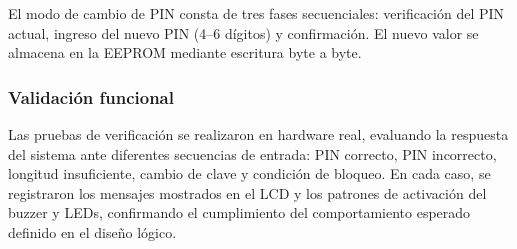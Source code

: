 El modo de cambio de PIN consta de tres fases secuenciales: verificación del PIN actual, ingreso del nuevo PIN (4–6 dígitos) y confirmación.  
El nuevo valor se almacena en la EEPROM mediante escritura byte a byte.

\subsubsection{Validación funcional}

Las pruebas de verificación se realizaron en hardware real, 
evaluando la respuesta del sistema ante diferentes secuencias de entrada: 
PIN correcto, PIN incorrecto, longitud insuficiente, cambio de clave y condición de bloqueo.  
En cada caso, se registraron los mensajes mostrados en el LCD y los patrones de activación del buzzer y LEDs, 
confirmando el cumplimiento del comportamiento esperado definido en el diseño lógico.
